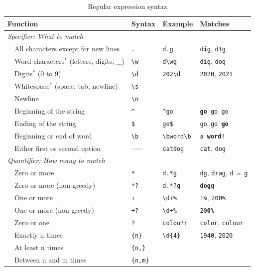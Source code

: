 
\newcommand{\ttt}[1]{\texttt{\small{#1}}}
\newcommand{\bs}[1]{\ttt{\textbackslash#1}}

\begin{table}
  \caption{\label{tab:regex}Regular expression syntax}{
  \begin{tabularx}{\textwidth}{lllll}
    \toprule
\multicolumn{2}{l}{Function}      & Syntax   & Example & Matches    \\
    \midrule
\multicolumn{2}{l}{\textit{Specifier: What to match}} \\
& All characters except for new lines   & \ttt{.} & \ttt{d.g} & \ttt{d\textbf{i}g}, \ttt{d\textbf{!}g}\\
& Word characters$^*$
  (letters, digits, \_)         & \bs{w} & \ttt{d\textbackslash{}wg} & \ttt{dig}, \ttt{dog} \\
& Digits$^*$ (0 to 9)                       & \bs{d} & \ttt{202\textbackslash{}d} & \ttt{2020}, \ttt{2021} \\
& Whitespace$^*$ (space, tab, newline) & \bs{s} \\
& Newline	& \bs{n} & \\

& Beginning of the string	& \ttt{\^{}} & \ttt{\^{}go} & \ttt{\textbf{go} {\color{gray}go go}}\\
& Ending of the string   & \ttt{\$} & \ttt{go\$} & \ttt{{\color{gray}go go} \textbf{go}} \\
& Beginning or end of word & \bs{b} & \ttt{\textbackslash{}bword\textbackslash{}b} & \ttt{{\color{gray}a} \textbf{word}\color{gray}!} \\
& Either first or second option  & \ttt{$\cdots$\textbar$\cdots$} & \ttt{cat\textbar{}dog} & \ttt{cat}, \ttt{dog}\\

\multicolumn{2}{l}{\textit{Quantifier: How many to match}} \\
& Zero or more & \ttt{*} & \ttt{d.*g} & \ttt{dg}, \ttt{drag}, \ttt{d = g} \\
& Zero or more (non-greedy) & \ttt{*?} & \ttt{d.*?g} & \ttt{\textbf{dog}{\color{gray}g}} \\
& One or more & \ttt{+}  & \ttt{\textbackslash{}d+\%} & \ttt{1\%}, \ttt{200\%} \\
& One or more (non-greedy) & \ttt{+?}  & \ttt{\textbackslash{}d+\%} & \ttt{{\color{gray}20}\textbf{0\%}} \\
& Zero or one  & \ttt{?} & \ttt{colou?r} & \ttt{color}, \ttt{colour} \\
& Exactly n times  & \ttt{\{n\}} & \ttt{\textbackslash{}d{\{4\}}} & \ttt{1940}, \ttt{2020} \\
& At least n times  & \ttt{\{n,\}} \\
& Between n and m times  & \ttt{\{n,m\}} \\


\end{tabularx}}
\end{table}
